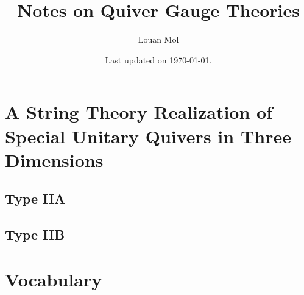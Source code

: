 \documentclass[a4paper,8pt]{article}
\title{Notes on Quiver Gauge Theories}
\author{Louan Mol}
\date{Last updated on \today.}
\begin{document}
\maketitle

\vspace{2cm}

\tableofcontents
  
\pagebreak

\nocite{*}

\section{A String Theory Realization of Special Unitary Quivers in Three Dimensions}

    \subsection{Type IIA}

    \subsection{Type IIB}

\pagebreak
\appendix

\section{Vocabulary}
\end{document}
